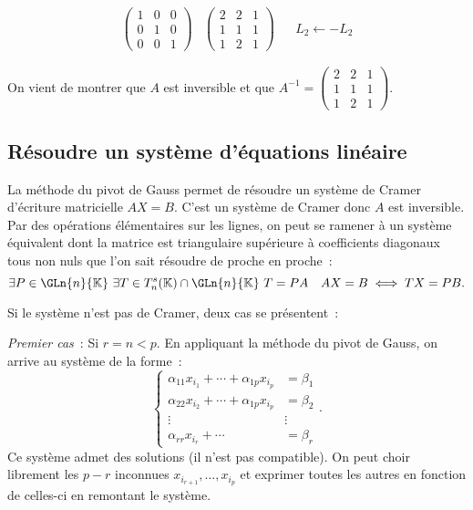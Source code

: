 \begin{align}
  \begin{pmatrix}  1 & 0 & 0 \\ 0 & 1 & 0\\ 0 & 0 & 1\end{pmatrix} & \begin{pmatrix} 2 & 2 & 1 \\ 1 & 1 & 1\\ 1 & 2 & 1 \end{pmatrix} && L_2 \leftarrow -L_2
\end{align}

On vient de montrer que $A$ est inversible et que $A^{-1}=\begin{pmatrix} 2 & 2 & 1 \\ 1 & 1 & 1\\ 1 & 2 & 1 \end{pmatrix}$.

\subsection{Résoudre un système d'équations linéaire}

La méthode du pivot de Gauss permet de résoudre un système de Cramer d'écriture matricielle $AX=B$. C'est un système de Cramer donc $A$ est inversible. Par des opérations élémentaires sur les lignes, on peut se ramener à un système équivalent dont la matrice est triangulaire supérieure à coefficients diagonaux tous non nuls que l'on sait résoudre de proche en proche~:
\begin{equation}
  \exists P \in \GLn{n}{\K} \ \exists T \in T_n^s(\K) \cap \GLn{n}{\K} \ T=PA \quad AX=B \iff TX=PB.
\end{equation}

Si le système n'est pas de Cramer, deux cas se présentent~:

\emph{Premier cas}~: Si $r=n < p$. En appliquant la méthode du pivot de Gauss, on arrive au système de la forme~:
\begin{equation}
  \begin{cases}
    \alpha_{11}x_{i_1} + \dotsb + \alpha_{1p}x_{i_p} &=\beta_1 \\
    \alpha_{22}x_{i_2} + \dotsb + \alpha_{1p}x_{i_p} &=\beta_2 \\
    \vdots & \vdots \\
    \alpha_{rr}x_{i_r} + \dotsb  &=\beta_r
  \end{cases}.
\end{equation}
Ce système admet des solutions (il n'est pas compatible). On peut choir librement les $p-r$ inconnues $x_{i_{r+1}}, \ldots, x_{i_p}$ et exprimer toutes les autres en fonction de celles-ci en remontant le système.

